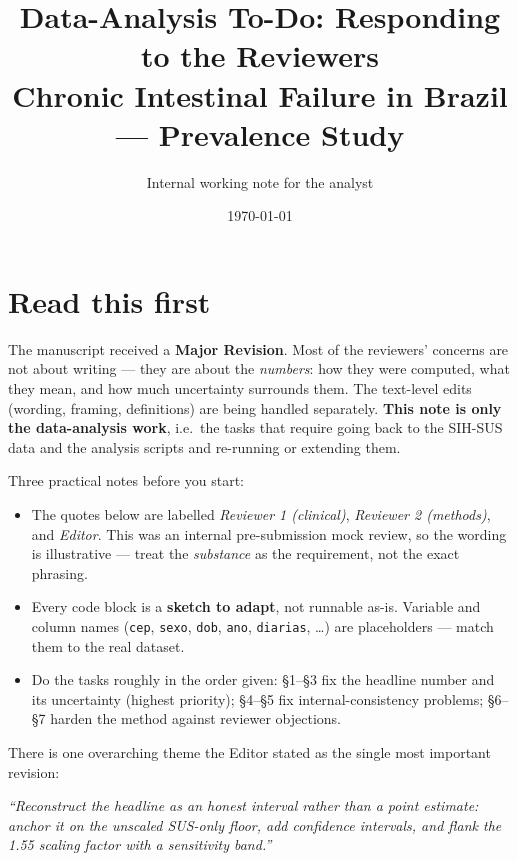 \documentclass[11pt,a4paper]{article}
\title{\textbf{Data-Analysis To-Do: Responding to the Reviewers}\\[3pt]
\large Chronic Intestinal Failure in Brazil --- Prevalence Study}
\author{Internal working note for the analyst}
\date{\today}
\newenvironment{reviewer}%
  {\def\FrameCommand{{\color{rulegray}\vrule width 1.5pt}\hspace{6pt}%
     \colorbox{quotebg}}%
   \MakeFramed{\advance\hsize-\width \FrameRestore}\small\itshape}%
  {\endMakeFramed}
\begin{document}
\maketitle

\section*{Read this first}

The manuscript received a \textbf{Major Revision}. Most of the reviewers' concerns are not
about writing --- they are about the \emph{numbers}: how they were computed, what they mean,
and how much uncertainty surrounds them. The text-level edits (wording, framing, definitions)
are being handled separately. \textbf{This note is only the data-analysis work}, i.e.\ the
tasks that require going back to the SIH-SUS data and the analysis scripts and re-running or
extending them.

Three practical notes before you start:

\begin{itemize}[leftmargin=*, topsep=2pt]
  \item The quotes below are labelled \emph{Reviewer 1 (clinical)}, \emph{Reviewer 2 (methods)},
        and \emph{Editor}. This was an internal pre-submission mock review, so the wording is
        illustrative --- treat the \emph{substance} as the requirement, not the exact phrasing.
  \item Every code block is a \textbf{sketch to adapt}, not runnable as-is. Variable and column
        names (\texttt{cep}, \texttt{sexo}, \texttt{dob}, \texttt{ano}, \texttt{diarias}, \dots)
        are placeholders --- match them to the real dataset.
  \item Do the tasks roughly in the order given: \S1--\S3 fix the headline number and its
        uncertainty (highest priority); \S4--\S5 fix internal-consistency problems; \S6--\S7
        harden the method against reviewer objections.
\end{itemize}

There is one overarching theme the Editor stated as the single most important revision:

\begin{reviewer}
``Reconstruct the headline as an honest interval rather than a point estimate: anchor it on the
unscaled SUS-only floor, add confidence intervals, and flank the 1.55 scaling factor with a
sensitivity band.''
\end{reviewer}
\end{document}
